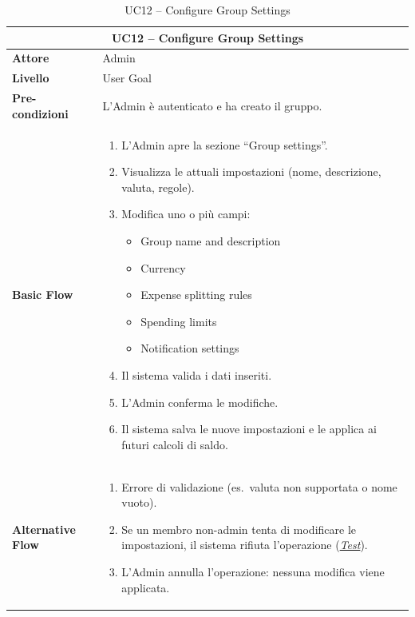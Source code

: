 \begin{table}[htbp]
    \centering
    \footnotesize
    \begin{tabularx}{\textwidth}{|l|X|}
        \hline
        \multicolumn{2}{|c|}{\textbf{UC12 -- Configure Group Settings}} \\
        \hline
        \textbf{Attore} & Admin \\
        \hline
        \textbf{Livello} & User Goal \\
        \hline
        \textbf{Pre-condizioni} & L'Admin è autenticato e ha creato il gruppo. \\
        \hline
        \textbf{Basic Flow} & 
        \begin{enumerate}[leftmargin=*, nosep, topsep=3pt]
            \item L'Admin apre la sezione ``Group settings''.
            \item Visualizza le attuali impostazioni (nome, descrizione, valuta, regole).
            \item Modifica uno o più campi:
            \begin{itemize}[nosep, label={--}, topsep=2pt]
                \item Group name and description
                \item Currency
                \item Expense splitting rules
                \item Spending limits
                \item Notification settings
            \end{itemize}
            \item Il sistema valida i dati inseriti.
            \item L'Admin conferma le modifiche.
            \item Il sistema salva le nuove impostazioni e le applica ai futuri calcoli di saldo.
        \end{enumerate} \\
        \hline
        \textbf{Alternative Flow} & 
        \begin{enumerate}[label=3\alph*., leftmargin=*, nosep, topsep=3pt]
            \item Errore di validazione (es.\ valuta non supportata o nome vuoto).
            \item Se un membro non-admin tenta di modificare le impostazioni, il sistema rifiuta l'operazione (\hyperref[test:uc12_unauthorized]{\textit{Test}}).
            \item L'Admin annulla l'operazione: nessuna modifica viene applicata.
        \end{enumerate} \\
        \hline
    \end{tabularx}
    \caption{UC12 -- Configure Group Settings}
    \label{tab:uc12}
\end{table}

